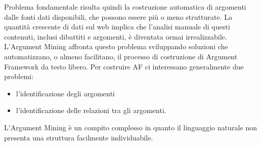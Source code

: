 Problema fondamentale risulta quindi la costruzione automatica di argomenti dalle fonti dati disponibili, che possono essere più o meno strutturate. La quantità crescente di dati sul web implica che l'analisi manuale di questi contenuti, inclusi dibattiti e argomenti, è diventata ormai irrealizzabile. L'Argument Mining affronta questo problema sviluppando soluzioni che automatizzano, o almeno facilitano, il processo di costruzione di Argument Framework da testo libero. Per costruire AF ci interessano generalmente due problemi:

\begin{itemize}
    \item l'identificazione degli argomenti
    \item l'identificazione delle relazioni tra gli argomenti.
\end{itemize}

L'Argument Mining è un compito complesso in quanto il linguaggio naturale non presenta una struttura facilmente individuabile.


